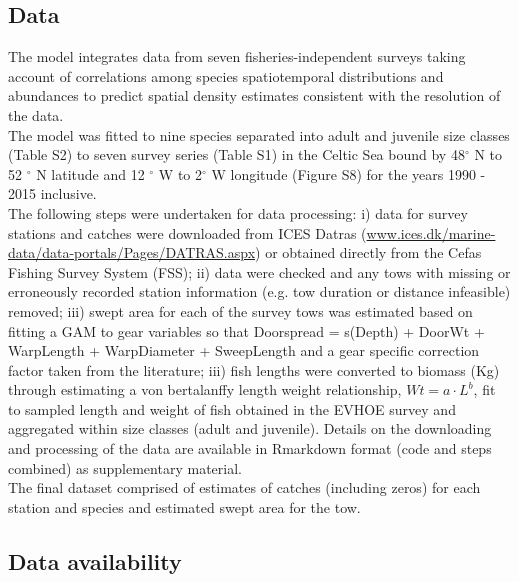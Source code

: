 \documentclass[fleqn,10pt]{wlscirep}
\begin{document}
\begin{linenumbers}
\subsection*{Data\\}

The model integrates data from seven fisheries-independent surveys taking
account of correlations among species spatiotemporal distributions and
abundances to predict spatial density estimates consistent with the resolution
of the data. \\

The model was fitted to nine species separated into adult and juvenile size
classes (Table S2) to seven survey series (Table S1) in the Celtic Sea bound by
48$^{\circ}$ N to 52 $^{\circ}$ N latitude and 12 $^{\circ}$ W to 2$^{\circ}$ W
longitude (Figure S8) for the years 1990 - 2015 inclusive. \\

The following steps were undertaken for data processing: i) data for survey
stations and catches were downloaded from ICES Datras
(\url{www.ices.dk/marine-data/data-portals/Pages/DATRAS.aspx}) or obtained
directly from the Cefas Fishing Survey System (FSS); ii) data were checked and
any tows with missing or erroneously recorded station information (e.g. tow
duration or distance infeasible) removed; iii) swept area for each of the
survey tows was estimated based on fitting a GAM to gear variables so that
Doorspread = s(Depth) + DoorWt + WarpLength + WarpDiameter + SweepLength and a
gear specific correction factor taken from the literature\cite{Piet2009}; iii)
fish lengths were converted to biomass (Kg) through estimating a von
bertalanffy length weight relationship, $Wt = a \cdot L^{b}$, fit to sampled
length and weight of fish obtained in the EVHOE survey and aggregated within
size classes (adult and juvenile). Details on the downloading and processing of
the data are available in Rmarkdown format (code and steps combined) as
supplementary material. \\

The final dataset comprised of estimates of catches (including zeros) for each
station and species and estimated swept area for the tow.\\

\subsection*{Data availability\\}


\end{linenumbers}
\end{document}
